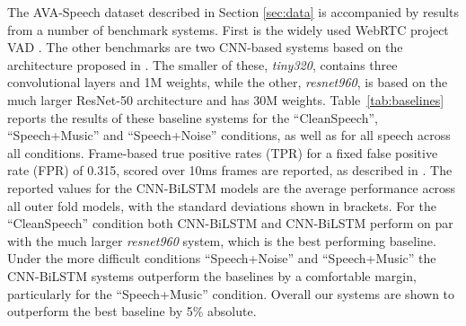 \documentclass{article}
\begin{document}
The AVA-Speech dataset described in Section \ref{sec:data} is accompanied by results from a number of benchmark systems.
First is the widely used WebRTC project VAD \cite{WebRTC}.
The other benchmarks are two CNN-based systems based on the architecture proposed in \cite{BigCNN}.
The smaller of these, \textit{tiny320}, contains three convolutional layers and 1M weights, while the other, \textit{resnet960}, is based on the much larger ResNet-50 architecture \cite{resnet50} and has 30M weights.
\mbox{Table \ref{tab:baselines}} reports the results of these baseline systems for the ``CleanSpeech'', ``Speech+Music'' and ``Speech+Noise'' conditions, as well as for all speech across all conditions.
Frame-based true positive rates (TPR) for a fixed false positive rate (FPR) of 0.315, scored over 10ms frames are reported, as described in \cite{AVASpeech}.
The reported values for the CNN-BiLSTM models are the average performance across all outer fold models, with the standard deviations shown in brackets.
For the ``CleanSpeech'' condition both CNN-BiLSTM and CNN-BiLSTM perform on par with the much larger \textit{resnet960} system, which is the best performing baseline.
Under the more difficult conditions ``Speech+Noise'' and ``Speech+Music'' the CNN-BiLSTM systems outperform the baselines by a comfortable margin, particularly for the ``Speech+Music'' condition.
Overall our systems are shown to outperform the best baseline by 5\% absolute.
\end{document}
